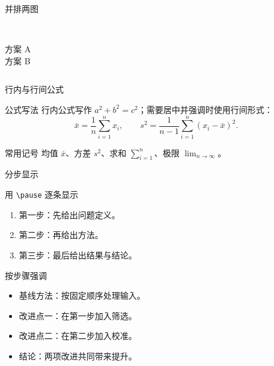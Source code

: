 \begin{frame}{并排两图}
  \begin{columns}[T,onlytextwidth]
      \centering
      \\
      {\small 方案 A}
      \centering
      \\
      {\small 方案 B}
  \end{columns}
\end{frame}

\begin{frame}{行内与行间公式}
  \begin{block}{公式写法}
    行内公式写作 $a^2+b^2=c^2$；需要居中并强调时使用行间形式：
    \[
      \bar{x}=\frac{1}{n}\sum_{i=1}^{n}x_i,\qquad
      s^2=\frac{1}{n-1}\sum_{i=1}^{n}(x_i-\bar{x})^2 .
    \]
  \end{block}

  \begin{exampleblock}{常用记号}
    均值 $\bar{x}$、方差 $s^2$、求和 $\sum_{i=1}^{n}$、极限 $\lim_{n\to\infty}$。
  \end{exampleblock}
\end{frame}

\begin{frame}{分步显示}
  \begin{exampleblock}{用 \texttt{\textbackslash pause} 逐条显示}
    \begin{enumerate}
      \item 第一步：先给出问题定义。
      \pause
      \item 第二步：再给出方法。
      \pause
      \item 第三步：最后给出结果与结论。
    \end{enumerate}
  \end{exampleblock}
\end{frame}

\begin{frame}{按步骤强调}
  \begin{itemize}
    \item 基线方法：按固定顺序处理输入。
    \item \alert<2>{改进点一}：在第一步加入筛选。
    \item \alert<3>{改进点二}：在第二步加入校准。
    \item \alert<4>{结论}：两项改进共同带来提升。
  \end{itemize}
\end{frame}

